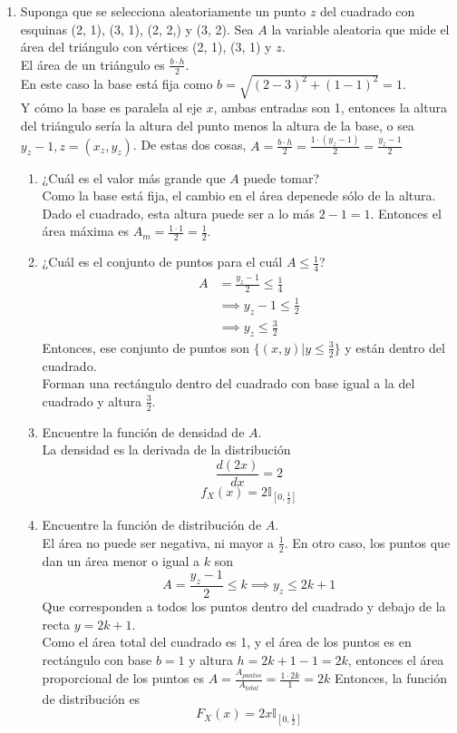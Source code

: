 \documentclass[12pt,a4paper]{report}
\begin{document}
\begin{enumerate}
		\item {
			Suponga que se selecciona aleatoriamente un punto $z$ del cuadrado con
			esquinas (2, 1), (3, 1), (2, 2,) y (3, 2). Sea $A$ la variable aleatoria
			que mide el área del triángulo con vértices (2, 1), (3, 1) y $z$.\\
			El área de un triángulo es $\frac{b\cdot h}{2}$. \\
			En este caso la base está fija como $b = \sqrt{(2-3)^2+(1-1)^2} = 1$.\\
			Y cómo la base es paralela al eje $x$, ambas entradas son 1,
			entonces la altura del triángulo sería la altura del punto menos la
			altura de la base, o sea $y_z-1, z = (x_z, y_z)$.
			De estas dos cosas, $A = \frac{b \cdot h}{2} = \frac{1 \cdot(y_z-1)}{2}
			= \frac{y_z-1}{2}$
			\begin{enumerate}
				\item {
					¿Cuál es el valor más grande que $A$ puede tomar?\\
					Como la base está fija, el cambio en el área depenede sólo
					de la altura.\\
					Dado el cuadrado, esta altura puede ser a lo más $2-1 = 1$.
					Entonces el área máxima es $A_m = \frac{1\cdot 1}{2} = \frac{1}{2}$.
				}
				\item {
					¿Cuál es el conjunto de puntos para el cuál $A \leq \frac{1}{4}$?
					\begin{align*}
						A &= \frac{y_z-1}{2} \leq \frac{1}{4}\\
						  &\implies y_z-1 \leq \frac{1}{2}\\
						  &\implies y_z \leq \frac{3}{2}
					\end{align*}
					Entonces, ese conjunto de puntos son $\{(x, y) | y \leq \frac{3}{2}\}$
					y están dentro del cuadrado.\\
					Forman una rectángulo dentro del cuadrado con base igual a
					la del cuadrado y altura $\frac{3}{2}$.
				}
				\item {
					Encuentre la función de densidad de $A$.\\
					La densidad es la derivada de la distribución
					\[\frac{d(2x)}{dx} = 2\]
					\[f_X(x) = 2 \mathbb{I}_{[0, \frac{1}{2}]}\]

				}
				\item {
					Encuentre la función de distribución de $A$.\\
					El área no puede ser negativa, ni mayor a $\frac{1}{2}$.
					En otro caso, los puntos que dan un área menor o igual a $k$
					son
					\[A = \frac{y_z-1}{2} \leq k \implies y_z \leq 2k + 1\]
					Que corresponden a todos los puntos dentro del cuadrado y
					debajo de la recta $y = 2k+1$.\\
					Como el área total del cuadrado es 1, y el área de los
					puntos es en rectángulo con base $b = 1$
					y altura $h = 2k+1-1 = 2k$, entonces el área proporcional de
					los puntos es
					$A = \frac{A_{puntos}}{A_{total}} = \frac{1 \cdot 2k}{1} = 2k$
					Entonces, la función de distribución es
					\[F_X(x) = 2x \mathbb{I}_{[0, \frac{1}{2}]}\]
				}
			\end{enumerate}
		}
		

\end{enumerate}
\end{document}
